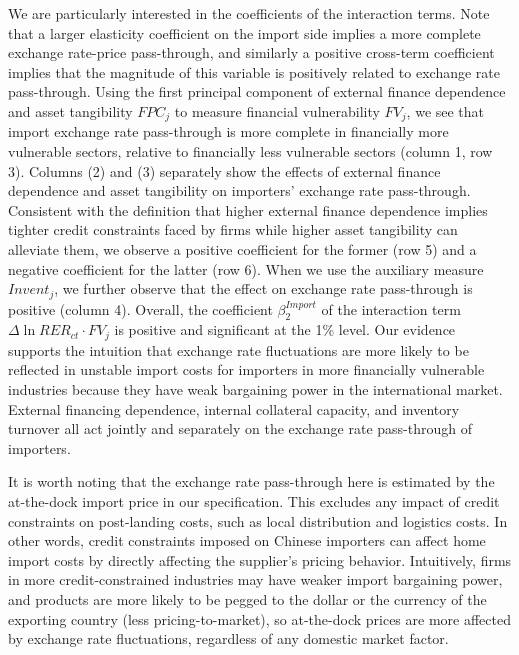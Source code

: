 \documentclass[12pt]{article}
\begin{document}
We are particularly interested in the coefficients of the interaction terms. Note that a larger elasticity coefficient on the import side implies a more complete exchange rate-price pass-through, and similarly a positive cross-term coefficient implies that the magnitude of this variable is positively related to exchange rate pass-through. Using the first principal component of external finance dependence and asset tangibility $FPC_j$ to measure financial vulnerability $FV_j$, we see that import exchange rate pass-through is more complete in financially more vulnerable sectors, relative to financially less vulnerable sectors (column 1, row 3). Columns (2) and (3) separately show the effects of external finance dependence and asset tangibility on importers' exchange rate pass-through. Consistent with the definition that higher external finance dependence implies tighter credit constraints faced by firms while higher asset tangibility can alleviate them, we observe a positive coefficient for the former (row 5) and a negative coefficient for the latter (row 6). When we use the auxiliary measure $Invent_j$, we further observe that the effect on exchange rate pass-through is positive (column 4). Overall, the coefficient $\beta^{Import}_2$ of the interaction term $\Delta \ln RER_{ct} \cdot FV_{j}$ is positive and significant at the 1\% level. Our evidence supports the intuition that exchange rate fluctuations are more likely to be reflected in unstable import costs for importers in more financially vulnerable industries because they have weak bargaining power in the international market. External financing dependence, internal collateral capacity, and inventory turnover all act jointly and separately on the exchange rate pass-through of importers.

It is worth noting that the exchange rate pass-through here is estimated by the at-the-dock import price in our specification. This excludes any impact of credit constraints on post-landing costs, such as local distribution and logistics costs. In other words, credit constraints imposed on Chinese importers can affect home import costs by directly affecting the supplier's pricing behavior. Intuitively, firms in more credit-constrained industries may have weaker import bargaining power, and products are more likely to be pegged to the dollar or the currency of the exporting country (less pricing-to-market), so at-the-dock prices are more affected by exchange rate fluctuations, regardless of any domestic market factor.
\end{document}
